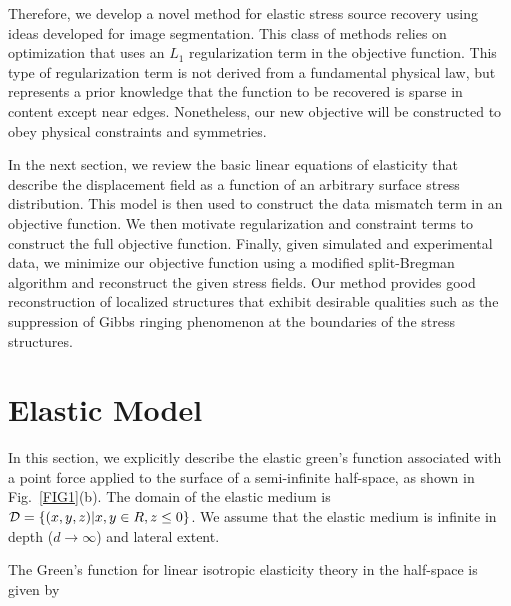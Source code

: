\documentclass[aps,prl,reprint,twocolumn,groupedaddress,showpacs]{revtex4-1}
\begin{document}
Therefore, we develop a novel method for elastic stress source
recovery using ideas developed for image segmentation.  This class of
methods relies on optimization that uses an $L_{1}$ regularization
term in the objective function.  This type of regularization term is
not derived from a fundamental physical law, but represents a prior
knowledge that the function to be recovered is sparse in content
except near edges.  Nonetheless, our new objective will be constructed
to obey physical constraints and symmetries.

In the next section, we review the basic linear equations of
elasticity that describe the displacement field as a function of an
arbitrary surface stress distribution. This model is then used to
construct the data mismatch term in an objective function. We then
motivate regularization and constraint terms to construct the full
objective function. Finally, given simulated and experimental data, we
minimize our objective function using a modified split-Bregman
algorithm and reconstruct the given stress fields. Our method provides
good reconstruction of localized structures that exhibit desirable
qualities such as the suppression of Gibbs ringing phenomenon at the
boundaries of the stress structures.


\section{Elastic Model}

In this section, we explicitly describe the elastic green's function
associated with a point force applied to the surface of a
semi-infinite half-space, as shown in Fig.~\ref{FIG1}(b). The domain
of the elastic medium is ${\cal D}=\left\{(x,y,z)|x,y\in
R,z\leq0\right\}$. We assume that the elastic medium is infinite
in depth ($d\to \infty$) and lateral extent.

The Green's function for linear isotropic elasticity theory 
in the half-space is given by
\end{document}
